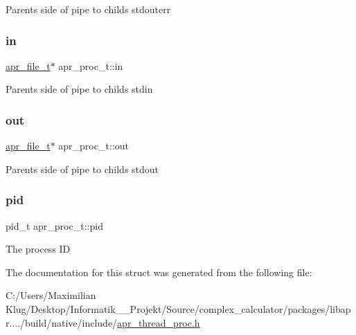 Parent\textquotesingle{}s side of pipe to child\textquotesingle{}s stdouterr \mbox{\label{structapr__proc__t_a914bda8939f9d17c9e2f238683fb994b}} 
\subsubsection{\texorpdfstring{in}{in}}
{\footnotesize\ttfamily \mbox{\hyperlink{structapr__file__t}{apr\+\_\+file\+\_\+t}}$\ast$ apr\+\_\+proc\+\_\+t\+::in}

Parent\textquotesingle{}s side of pipe to child\textquotesingle{}s stdin \mbox{\label{structapr__proc__t_acb7d7c5226217946d761f0e90ff70d24}} 
\subsubsection{\texorpdfstring{out}{out}}
{\footnotesize\ttfamily \mbox{\hyperlink{structapr__file__t}{apr\+\_\+file\+\_\+t}}$\ast$ apr\+\_\+proc\+\_\+t\+::out}

Parent\textquotesingle{}s side of pipe to child\textquotesingle{}s stdout \mbox{\label{structapr__proc__t_a8a8ee4b234156485a72497023e7482e5}} 
\subsubsection{\texorpdfstring{pid}{pid}}
{\footnotesize\ttfamily pid\+\_\+t apr\+\_\+proc\+\_\+t\+::pid}

The process ID 

The documentation for this struct was generated from the following file\+:\begin{DoxyCompactItemize}
\item 
C\+:/\+Users/\+Maximilian Klug/\+Desktop/\+Informatik\+\_\+\_\+\+Projekt/\+Source/complex\+\_\+calculator/packages/libapr..../build/native/include/\mbox{\hyperlink{apr__thread__proc_8h}{apr\+\_\+thread\+\_\+proc.\+h}}\end{DoxyCompactItemize}
